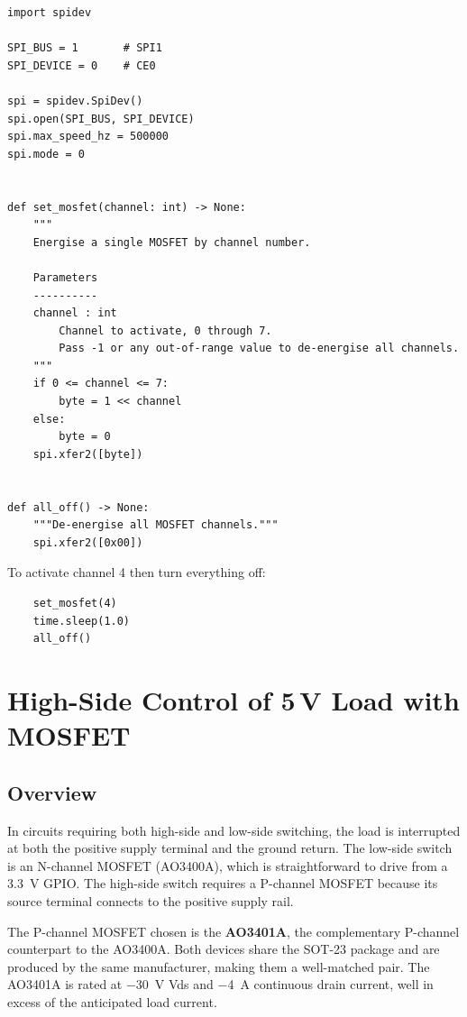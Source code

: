 \begin{verbatim}
import spidev

SPI_BUS = 1       # SPI1
SPI_DEVICE = 0    # CE0

spi = spidev.SpiDev()
spi.open(SPI_BUS, SPI_DEVICE)
spi.max_speed_hz = 500000
spi.mode = 0


def set_mosfet(channel: int) -> None:
    """
    Energise a single MOSFET by channel number.

    Parameters
    ----------
    channel : int
        Channel to activate, 0 through 7.
        Pass -1 or any out-of-range value to de-energise all channels.
    """
    if 0 <= channel <= 7:
        byte = 1 << channel
    else:
        byte = 0
    spi.xfer2([byte])


def all_off() -> None:
    """De-energise all MOSFET channels."""
    spi.xfer2([0x00])
\end{verbatim}

\noindent To activate channel 4 then turn everything off:

\begin{verbatim}
    set_mosfet(4)
    time.sleep(1.0)
    all_off()
\end{verbatim}


\section{High-Side Control of 5\,V Load with MOSFET}

\subsection{Overview}

In circuits requiring both high-side and low-side switching, the load is interrupted at
both the positive supply terminal and the ground return. The low-side switch is an
N-channel MOSFET (AO3400A), which is straightforward to drive from a \SI{3.3}{\volt}
GPIO. The high-side switch requires a P-channel MOSFET because its source terminal
connects to the positive supply rail.

The P-channel MOSFET chosen is the \textbf{AO3401A}, the complementary P-channel
counterpart to the AO3400A. Both devices share the SOT-23 package and are produced
by the same manufacturer, making them a well-matched pair. The AO3401A is rated at
\SI{-30}{\volt} Vds and \SI{-4}{\ampere} continuous drain current, well in excess of
the anticipated load current.

